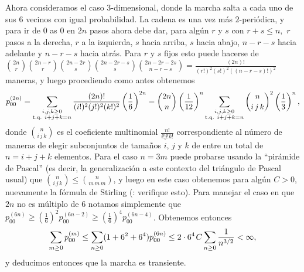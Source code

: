 \begin{ex}\label{ex:srw-3-a}
Ahora consideramos el caso $3$-dimensional, donde la marcha salta a cada uno de sus 6 vecinos con igual probabilidad.
La cadena es una vez más $2$-periódica, y para ir de $0$ as $0$ en $2n$ pasos ahora debe dar, para algún $r$ y $s$ con $r+s\leq n,$ $r$ pasos a la derecha, $r$ a la izquierda, $s$ hacia arriba, $s$ hacia abajo, $n-r-s$ hacia adelante y $n-r-s$ hacia atrás.
Para $r$ y $s$ fijos esto puede hacerse de $\binom{2n}{r}\binom{2n-r}{r}\binom{2n-2r}{s}\binom{2n-2r-s}{s}\binom{2n-2r-2s}{n-r-s}=\frac{(2n)!}{(r!)^2(s!)^2((n-r-s)!)^2}$ maneras, y luego procediendo como antes obtenemos
\begin{equation}\label{eq:srw-3-a1}
p^{(2n)}_{00}=\sum_{\substack{i,j,k\geq0\\\text{\upshape{t.q. }}i+j+k=n}}\frac{(2n)!}{(i!)^2(j!)^2(k!)^2}\left(\frac16\right)^{2n}
=\binom{2n}{n}\left(\frac1{12}\right)^{n}\sum_{\substack{i,j,k\geq0\\\text{\upshape{t.q. }}i+j+k=n}}\binom{n}{i\,j\,k}^2\left(\frac13\right)^{n},
\end{equation}
donde $\binom{n}{i\,j\,k}$ es el coeficiente multinomial $\frac{n!}{i!j!k!}$ correspondiente al número de maneras de elegir subconjuntos de tamaños $i$, $j$ y $k$ de entre un total de $n=i+j+k$ elementos.
Para el caso $n=3m$ puede probarse usando la ``pirámide de Pascal'' (es decir, la generalización a este contexto del triángulo de Pascal usual) que $\binom{n}{i\,j\,k}\leq\binom{n}{m\,m\,m}$, y luego en este caso obtenemos
para algún $C>0$, nuevamente la fórmula de Stirling (\uexers: verifique esto).
Para manejar el caso en que $2n$ no es múltiplo de $6$ notamos simplemente que $p^{(6n)}_{00}\geq(\frac16)^2p^{(6n-2)}_{00}\geq(\frac16)^4p^{(6n-4)}_{00}$.
Obtenemos entonces
\[\sum_{m\geq0}p^{(m)}_{00}\leq\sum_{n\geq0}(1+6^2+6^4)p^{(6n)}_{00}\leq2\cdot6^4\hspace{0.1em} C\sum_{n\geq0}\frac1{n^{3/2}}<\infty,\]
y deducimos entonces que la marcha es transiente.
\end{ex}


